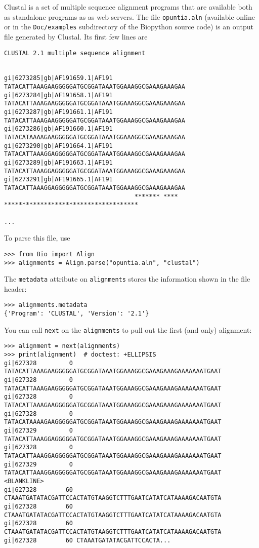 Clustal is a set of multiple sequence alignment programs that are available both as standalone programs as as web servers. The file \verb|opuntia.aln| (available online or in the \verb|Doc/examples| subdirectory of the Biopython source code) is an output file generated by Clustal. Its first few lines are
\begin{verbatim}
CLUSTAL 2.1 multiple sequence alignment


gi|6273285|gb|AF191659.1|AF191      TATACATTAAAGAAGGGGGATGCGGATAAATGGAAAGGCGAAAGAAAGAA
gi|6273284|gb|AF191658.1|AF191      TATACATTAAAGAAGGGGGATGCGGATAAATGGAAAGGCGAAAGAAAGAA
gi|6273287|gb|AF191661.1|AF191      TATACATTAAAGAAGGGGGATGCGGATAAATGGAAAGGCGAAAGAAAGAA
gi|6273286|gb|AF191660.1|AF191      TATACATAAAAGAAGGGGGATGCGGATAAATGGAAAGGCGAAAGAAAGAA
gi|6273290|gb|AF191664.1|AF191      TATACATTAAAGGAGGGGGATGCGGATAAATGGAAAGGCGAAAGAAAGAA
gi|6273289|gb|AF191663.1|AF191      TATACATTAAAGGAGGGGGATGCGGATAAATGGAAAGGCGAAAGAAAGAA
gi|6273291|gb|AF191665.1|AF191      TATACATTAAAGGAGGGGGATGCGGATAAATGGAAAGGCGAAAGAAAGAA
                                    ******* **** *************************************

...
\end{verbatim}
To parse this file, use
\begin{verbatim}
>>> from Bio import Align
>>> alignments = Align.parse("opuntia.aln", "clustal")
\end{verbatim}
The \verb|metadata| attribute on \verb|alignments| stores the information shown in the file header:
\begin{verbatim}
>>> alignments.metadata
{'Program': 'CLUSTAL', 'Version': '2.1'}
\end{verbatim}
You can call \verb|next| on the \verb|alignments| to pull out the first (and only) alignment:
\begin{verbatim}
>>> alignment = next(alignments)
>>> print(alignment)  # doctest: +ELLIPSIS
gi|627328         0 TATACATTAAAGAAGGGGGATGCGGATAAATGGAAAGGCGAAAGAAAGAAAAAAATGAAT
gi|627328         0 TATACATTAAAGAAGGGGGATGCGGATAAATGGAAAGGCGAAAGAAAGAAAAAAATGAAT
gi|627328         0 TATACATTAAAGAAGGGGGATGCGGATAAATGGAAAGGCGAAAGAAAGAAAAAAATGAAT
gi|627328         0 TATACATAAAAGAAGGGGGATGCGGATAAATGGAAAGGCGAAAGAAAGAAAAAAATGAAT
gi|627329         0 TATACATTAAAGGAGGGGGATGCGGATAAATGGAAAGGCGAAAGAAAGAAAAAAATGAAT
gi|627328         0 TATACATTAAAGGAGGGGGATGCGGATAAATGGAAAGGCGAAAGAAAGAAAAAAATGAAT
gi|627329         0 TATACATTAAAGGAGGGGGATGCGGATAAATGGAAAGGCGAAAGAAAGAAAAAAATGAAT
<BLANKLINE>
gi|627328        60 CTAAATGATATACGATTCCACTATGTAAGGTCTTTGAATCATATCATAAAAGACAATGTA
gi|627328        60 CTAAATGATATACGATTCCACTATGTAAGGTCTTTGAATCATATCATAAAAGACAATGTA
gi|627328        60 CTAAATGATATACGATTCCACTATGTAAGGTCTTTGAATCATATCATAAAAGACAATGTA
gi|627328        60 CTAAATGATATACGATTCCACTA...
\end{verbatim}
